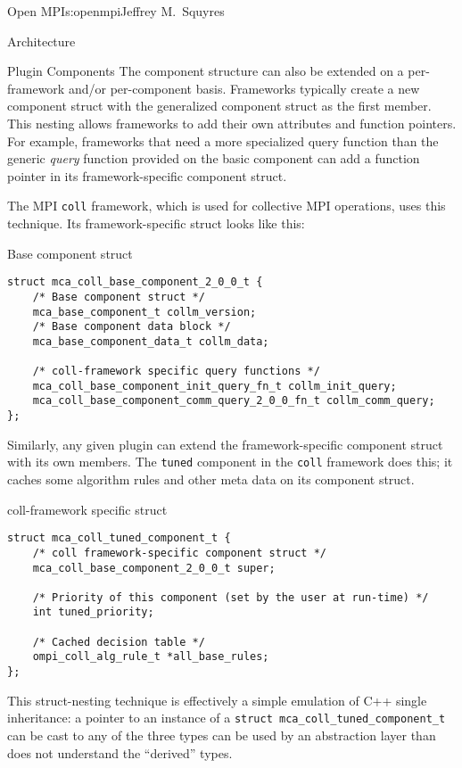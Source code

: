 \begin{aosachapter}{Open MPI}{s:openmpi}{Jeffrey M.\ Squyres}
\begin{aosasect1}{Architecture}
\begin{aosasect2}{Plugin Components}
The component structure can also be extended on a per-framework and/or
per-component basis.  Frameworks typically create a new component
struct with the generalized component struct as the first member.
%
This nesting allows frameworks to add their own attributes and
function pointers.  
%
For example, frameworks that need a more specialized query function
than the generic {\em query} function provided on the basic component
can add a function pointer in its framework-specific component struct.

The MPI {\tt coll} framework, which is used for collective MPI
operations, uses this technique.  Its framework-specific struct looks
like this:

\begin{aosabox}{Base component struct}
\begin{verbatim}
struct mca_coll_base_component_2_0_0_t {
    /* Base component struct */
    mca_base_component_t collm_version;
    /* Base component data block */
    mca_base_component_data_t collm_data;

    /* coll-framework specific query functions */
    mca_coll_base_component_init_query_fn_t collm_init_query;
    mca_coll_base_component_comm_query_2_0_0_fn_t collm_comm_query;
};
\end{verbatim}
\end{aosabox}

Similarly, any given plugin can extend the framework-specific
component struct with its own members.  
%
The {\tt tuned} component in the {\tt coll} framework does this; it
caches some algorithm rules and other meta data on its component
struct.  

\begin{aosabox}{coll-framework specific struct}
\begin{verbatim}
struct mca_coll_tuned_component_t {
    /* coll framework-specific component struct */ 
    mca_coll_base_component_2_0_0_t super;
    
    /* Priority of this component (set by the user at run-time) */
    int tuned_priority;
    
    /* Cached decision table */
    ompi_coll_alg_rule_t *all_base_rules;
};
\end{verbatim}
\end{aosabox}

This struct-nesting technique is effectively a simple emulation of C++
single inheritance: a pointer to an instance of a {\tt struct
  mca\_\-coll\_\-tuned\_\-component\_\-t} can be cast to any of the
three types can be used by an abstraction layer than does not
understand the ``derived'' types.


\end{aosasect2}
\end{aosasect1}
\end{aosachapter}
